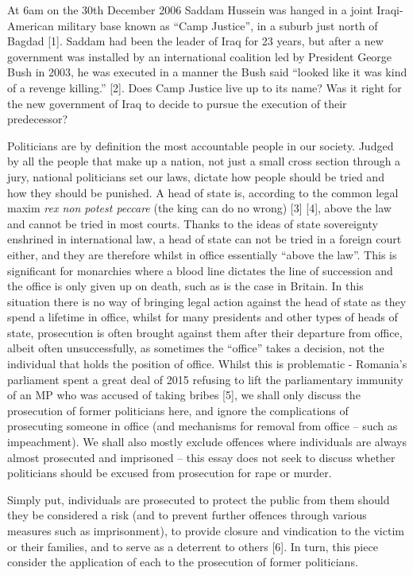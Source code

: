 \documentclass[11pt,a4paper]{report}
\newcounter{count}
\begin{document}
	\begin{multicols}{2}
		
		At 6am on the 30th December 2006 Saddam Hussein was hanged in a joint Iraqi-American military base known as “Camp Justice”, in a suburb just north of Bagdad [1]. Saddam had been the leader of Iraq for 23 years, but after a new government was installed by an international coalition led by President George Bush in 2003, he was executed in a manner the Bush said “looked like it was kind of a revenge killing.” [2]. Does Camp Justice live up to its name? Was it right for the new government of Iraq to decide to pursue the execution of their predecessor? 
		
		Politicians are by definition the most accountable people in our society. Judged by all the people that make up a nation, not just a small cross section through a jury, national politicians set our laws, dictate how people should be tried and how they should be punished. A head of state is, according to the common legal maxim \textit{rex non potest peccare} (the king can do no wrong) [3] [4], above the law and cannot be tried in most courts. Thanks to the ideas of state sovereignty enshrined in international law, a head of state can not be tried in a foreign court either, and they are therefore whilst in office essentially “above the law”. This is significant for monarchies where a blood line dictates the line of succession and the office is only given up on death, such as is the case in Britain. In this situation there is no way of bringing legal action against the head of state as they spend a lifetime in office, whilst for many presidents and other types of heads of state, prosecution is often brought against them after their departure from office, albeit often unsuccessfully, as sometimes the “office” takes a decision, not the individual that holds the position of office. Whilst this is problematic - Romania’s parliament spent a great deal of 2015 refusing to lift the parliamentary immunity of an MP who was accused of taking bribes [5], we shall only discuss the prosecution of former politicians here, and ignore the complications of prosecuting someone in office (and mechanisms for removal from office – such as impeachment). We shall also mostly exclude offences where individuals are always almost prosecuted and imprisoned – this essay does not seek to discuss whether politicians should be excused from prosecution for rape or murder. 
		
		Simply put, individuals are prosecuted to protect the public from them should they be considered a risk (and to prevent further offences through various measures such as imprisonment), to provide closure and vindication to the victim or their families, and to serve as a deterrent to others [6]. In turn, this piece consider the application of each to the prosecution of former politicians. 
		

\end{multicols}
\end{document}
